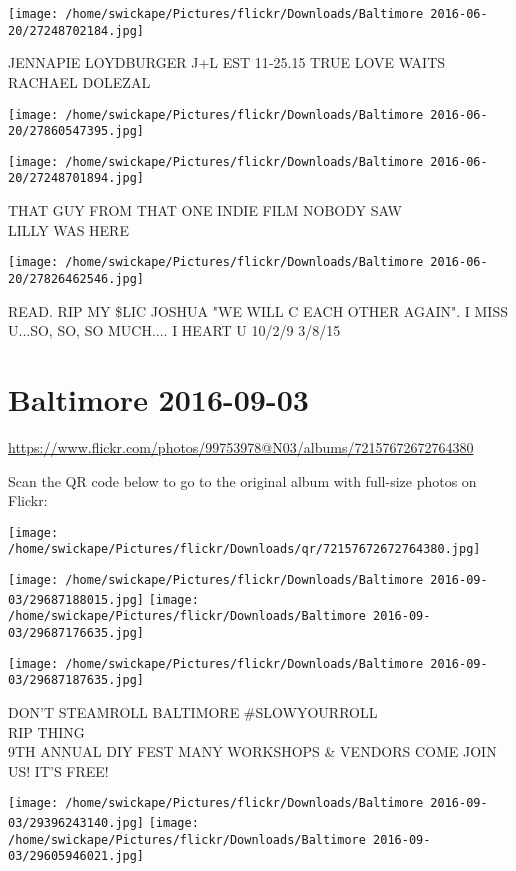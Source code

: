 \documentclass[10pt,letterpaper]{article}
\begin{document}
\vspace{0.25in}
\texttt{[image: /home/swickape/Pictures/flickr/Downloads/Baltimore 2016-06-20/27248702184.jpg]}

JENNAPIE LOYDBURGER J+L EST 11{-}25.15 TRUE LOVE WAITS\\
RACHAEL DOLEZAL
\pagebreak

\texttt{[image: /home/swickape/Pictures/flickr/Downloads/Baltimore 2016-06-20/27860547395.jpg]}

\vspace{0.25in}
\texttt{[image: /home/swickape/Pictures/flickr/Downloads/Baltimore 2016-06-20/27248701894.jpg]}

THAT GUY FROM THAT ONE INDIE FILM NOBODY SAW\\
LILLY WAS HERE
\pagebreak

\texttt{[image: /home/swickape/Pictures/flickr/Downloads/Baltimore 2016-06-20/27826462546.jpg]}

READ.  RIP MY \$LIC JOSHUA "WE WILL C EACH OTHER AGAIN".  I MISS U...SO, SO, SO MUCH.... I HEART U 10/2/9 3/8/15
\pagebreak

\section*{Baltimore 2016-09-03}

\url{https://www.flickr.com/photos/99753978@N03/albums/72157672672764380}

Scan the QR code below to go to the original album with full-size photos on Flickr:

\texttt{[image: /home/swickape/Pictures/flickr/Downloads/qr/72157672672764380.jpg]}
\pagebreak

\texttt{[image: /home/swickape/Pictures/flickr/Downloads/Baltimore 2016-09-03/29687188015.jpg]}
\texttt{[image: /home/swickape/Pictures/flickr/Downloads/Baltimore 2016-09-03/29687176635.jpg]}

\vspace{0.25in}
\texttt{[image: /home/swickape/Pictures/flickr/Downloads/Baltimore 2016-09-03/29687187635.jpg]}

DON'T STEAMROLL BALTIMORE \#SLOWYOURROLL\\
RIP THING\\
9TH ANNUAL DIY FEST MANY WORKSHOPS \& VENDORS COME JOIN US!  IT'S FREE!
\pagebreak

\texttt{[image: /home/swickape/Pictures/flickr/Downloads/Baltimore 2016-09-03/29396243140.jpg]}
\texttt{[image: /home/swickape/Pictures/flickr/Downloads/Baltimore 2016-09-03/29605946021.jpg]}
\end{document}
